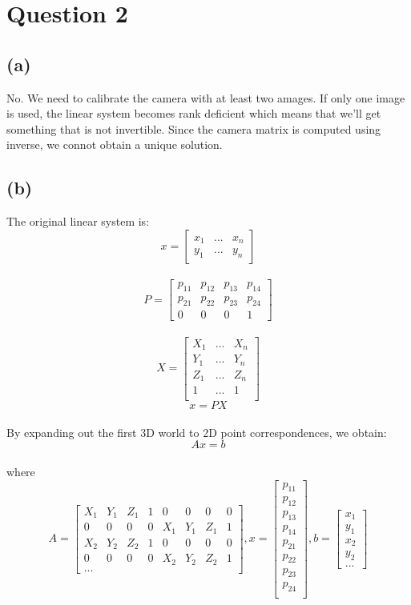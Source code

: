 \documentclass[letterpaper]{article}
\begin{document}
\section*{Question 2}
\subsection*{(a)}
No. We need to calibrate the camera with at least two amages. If only one image is used, the linear system becomes rank deficient which means that we'll get something that is not invertible. Since the camera matrix is computed using inverse, we connot obtain a unique solution.\\
\subsection*{(b)}
The original linear system is:\\
$$x=\begin{bmatrix}
x_1 & ... & x_n\\
y_1 & ... & y_n
\end{bmatrix}
$$\\
$$P=\begin{bmatrix}
p_{11} & p_{12} & p_{13} & p_{14}\\
p_{21} & p_{22} & p_{23} & p_{24}\\
0 & 0 & 0 & 1
\end{bmatrix}$$\\
$$X=\begin{bmatrix}
X_1 & ... & X_n\\
Y_1 & ... & Y_n\\
Z_1 & ... & Z_n\\
1 & ... & 1\\
\end{bmatrix}$$
$$x = PX$$\\
By expanding out the first 3D world to 2D point correspondences, we obtain:\\
$$Ax = b$$\\
where\\
$$A=\begin{bmatrix}
X_1 & Y_1 & Z_1 & 1 & 0 & 0 & 0 & 0\\
0 & 0 & 0 & 0 & X_1 & Y_1 & Z_1 & 1\\
X_2 & Y_2 & Z_2 & 1 & 0 & 0 & 0 & 0\\
0 & 0 & 0 & 0 & X_2 & Y_2 & Z_2 & 1\\
...
\end{bmatrix}
, x=
\begin{bmatrix}
p_{11}\\
p_{12}\\
p_{13}\\
p_{14}\\
p_{21}\\
p_{22}\\
p_{23}\\
p_{24}\\
\end{bmatrix}, b =
\begin{bmatrix}
x_1\\
y_1\\
x_2\\
y_2\\
...
\end{bmatrix}$$
\end{document}
